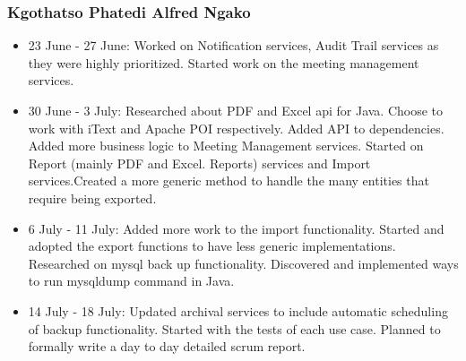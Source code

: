 \documentclass[12pt]{article}
\begin{document}
\subsubsection{Kgothatso Phatedi Alfred Ngako}
\begin{itemize}
	\item 23 June - 27 June: Worked on Notification services, Audit Trail services as they were highly prioritized. Started work on the meeting management services.
	\item 30 June - 3 July: Researched about PDF and Excel api for Java. Choose to work with iText and Apache POI respectively. Added API to dependencies. Added more business logic to Meeting Management services. Started on Report (mainly PDF and Excel. Reports) services and Import services.Created a more generic method to handle the many entities that require being exported.	
	\item 6 July - 11 July: Added more work to the import functionality. Started and adopted the export functions to have less generic implementations. Researched on mysql back up functionality. Discovered and implemented ways to run mysqldump command in Java.
	\item 14  July - 18 July: Updated archival services to include automatic scheduling of backup functionality. Started with the tests of each use case. Planned to formally write a day to day detailed scrum report.
\end{itemize}
\end{document}
